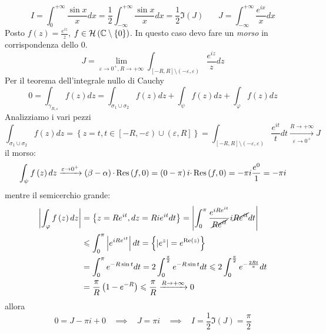 \Soluzione
\begin{equation*}
I=\int ^{+\infty }_{0}\frac{\sin x}{x} dx=\frac{1}{2}\int ^{+\infty }_{-\infty }\frac{\sin x}{x} dx=\frac{1}{2}\Im \left( J\right) \ \ \ \ \ \ \ \ J=\int ^{+\infty }_{-\infty }\frac{e^{ix}}{x} dx
\end{equation*}
Posto $f\left( z\right) =\frac{e^{iz}}{z}$, $f\in \Hc \left(\CC  \setminus \left\{0\right\}\right)$. In questo caso devo fare un \textit{morso} in corrispondenza dello $0$.
\begin{equation*}
J=\lim _{\varepsilon \rightarrow 0^{+} ,R\rightarrow +\infty }\int _{\left[ -R,R\right] \setminus \left( -\varepsilon ,\varepsilon \right)}\frac{e^{iz}}{z} dz
\end{equation*}
Per il teorema dell'integrale nullo di Cauchy
\begin{equation*}
0=\int _{\gamma _{R,\varepsilon }} f\left( z\right) dz=\int _{\sigma _{1} \cup \sigma _{2}} f\left( z\right) dz+\int _{\psi } f\left( z\right) dz+\int _{\varphi } f\left( z\right) dz
\end{equation*}
Analizziamo i vari pezzi
\begin{equation*}
\int _{\sigma _{1} \cup \sigma _{2}} f\left( z\right) dz=\left\{z=t,t\in \left[ -R,-\varepsilon \right) \cup \left( \varepsilon ,R\right]\right\} =\int _{\left[ -R,R\right] \setminus \left( -\varepsilon ,\varepsilon \right)}\frac{e^{it}}{t} dt\xrightarrow[\varepsilon \rightarrow 0^{+}]{R\rightarrow +\infty } J
\end{equation*}
il morso:
\begin{equation*}
\int _{\psi } f\left( z\right) dz\xrightarrow{\varepsilon \rightarrow 0^{+}}\left( \beta -\alpha \right) \cdotp \Res \left( f,0\right) =\left( 0-\pi \right) i\cdotp \Res \left( f,0\right) =-\pi i\frac{e^{0}}{1} =-\pi i
\end{equation*}
mentre il semicerchio grande:
\begin{align*}
\left| \int _{\varphi } f\left( z\right) dz\right|  & =\left\{z=Re^{it} ,dz=Rie^{it} dt\right\} =\left| \int ^{\pi }_{0}\frac{e^{iRe^{it}}}{\cancel{Re^{it}}} i\cancel{Re^{it}} dt\right| \\
 & \leqslant \int ^{\pi }_{0}\left| e^{iRe^{it}}\right| dt=\left\{\left| e^{z}\right| =e^{\Re \left( z\right)}\right\}\\
 & =\int ^{\pi }_{0} e^{-R\sin t} dt=2\int ^{\frac{\pi }{2}}_{0} e^{-R\sin t} dt\leqslant 2\int ^{\frac{\pi }{2}}_{0} e^{-\frac{2Rt}{\pi }} dt\\
 & =\frac{\pi }{R}\left( 1-e^{-R}\right) \leqslant \frac{\pi }{R}\xrightarrow{R\rightarrow +\infty } 0
\end{align*}
allora
\begin{equation*}
0=J-\pi i+0\ \ \ \ \implies \ \ \ \ J=\pi i\ \ \ \ \implies \ \ \ \ I=\frac{1}{2}\Im \left( J\right) =\frac{\pi }{2}
\end{equation*}
\Soluzione

